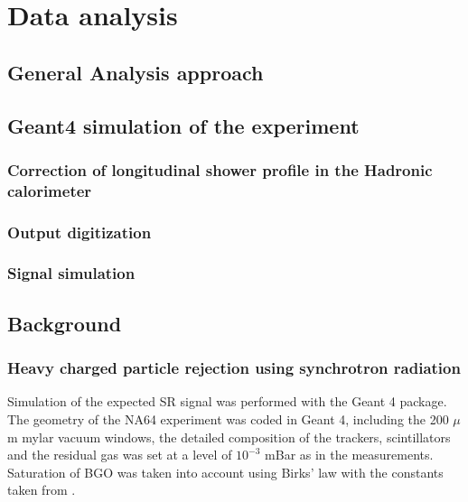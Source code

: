 
\newcommand{\pdirthree}{chapters/plots/chapter3}

\chapter{Data analysis} %
\label{chapter3} %


\section{General Analysis approach}
\label{ch3:sec:analysis-approach}

\section{Geant4 simulation of the experiment}
\label{ch3:sec:geant4}

\subsection{Correction of longitudinal shower profile in the Hadronic calorimeter}
\label{ch3:sec:geant4-hcal-corr}

\subsection{Output digitization}
\label{ch3:sec:geant4-digitization}

\subsection{Signal simulation}
\label{ch3:sec:geant4-signal}

\section{Background}
\label{ch3:sec:bkg}

\subsection{Heavy charged particle rejection using synchrotron radiation}
\label{ch3:sec:bkg-srd}

Simulation of the expected SR signal was performed with the Geant 4 package\cite{ALLISON2016186,1610988,AGOSTINELLI2003250}.
The geometry of the NA64 experiment was coded in Geant 4, including the 200 $\mu$m mylar vacuum windows, the detailed composition of the trackers, scintillators and the residual gas was set at a level of $10^{-3}$ mBar as in the measurements. Saturation of BGO was taken into account using Birks' law with the constants taken from \cite{AVDEICHIKOV2002251}.

